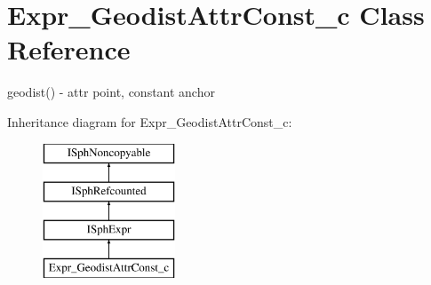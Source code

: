 \hypertarget{classExpr__GeodistAttrConst__c}{\section{Expr\-\_\-\-Geodist\-Attr\-Const\-\_\-c Class Reference}
\label{classExpr__GeodistAttrConst__c}
}


geodist() -\/ attr point, constant anchor  


Inheritance diagram for Expr\-\_\-\-Geodist\-Attr\-Const\-\_\-c\-:\begin{figure}[H]
\begin{center}
\leavevmode
\includegraphics[height=4.000000cm]{classExpr__GeodistAttrConst__c}
\end{center}
\end{figure}
